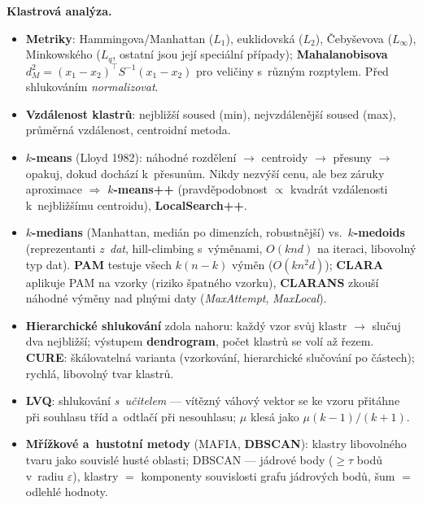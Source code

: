 \documentclass[11pt,a4paper]{article}
\theoremstyle{definition}
\begin{document}
\textbf{Klastrová analýza.}
\begin{itemize}
\item \textbf{Metriky}: Hammingova/Manhattan ($L_1$), euklidovská ($L_2$), Čebyševova
 ($L_\infty$), Minkowského ($L_q$, ostatní jsou její speciální případy);
 \textbf{Mahalanobisova} $d_M^2=(x_1-x_2)^{\!\top}S^{-1}(x_1-x_2)$ pro veličiny
 s~různým rozptylem. Před shlukováním \emph{normalizovat}.
\item \textbf{Vzdálenost klastrů}: nejbližší soused (min), nejvzdálenější soused (max),
 průměrná vzdálenost, centroidní metoda.
\item \textbf{$k$-means} (Lloyd 1982): náhodné rozdělení $\to$ centroidy $\to$ přesuny
 $\to$ opakuj, dokud dochází k~přesunům. Nikdy nezvýší cenu, ale bez záruky aproximace
 $\Rightarrow$ \textbf{$k$-means++} (pravděpodobnost $\propto$ kvadrát vzdálenosti
 k~nejbližšímu centroidu), \textbf{LocalSearch++}.
\item \textbf{$k$-medians} (Manhattan, medián po dimenzích, robustnější) vs.\
 \textbf{$k$-medoids} (reprezentanti \emph{z~dat}, hill-climbing s~výměnami,
 $O(knd)$ na iteraci, libovolný typ dat). \textbf{PAM} testuje všech $k(n-k)$ výměn
 ($O(kn^2d)$); \textbf{CLARA} aplikuje PAM na vzorky (riziko špatného vzorku),
 \textbf{CLARANS} zkouší náhodné výměny nad plnými daty (\emph{MaxAttempt},
 \emph{MaxLocal}).
\item \textbf{Hierarchické shlukování} zdola nahoru: každý vzor svůj klastr $\to$ slučuj dva
 nejbližší; výstupem \textbf{dendrogram}, počet klastrů se volí až řezem.
 \textbf{CURE}: škálovatelná varianta (vzorkování, hierarchické slučování po částech);
 rychlá, libovolný tvar klastrů.
\item \textbf{LVQ}: shlukování \emph{s~učitelem} --- vítězný váhový vektor se ke vzoru
 přitáhne při souhlasu tříd a~odtlačí při nesouhlasu; $\mu$ klesá jako $\mu(k-1)/(k+1)$.
\item \textbf{Mřížkové a~hustotní metody} (MAFIA, \textbf{DBSCAN}): klastry libovolného
 tvaru jako souvislé husté oblasti; DBSCAN --- jádrové body ($\ge\tau$ bodů v~radiu
 $\varepsilon$), klastry $=$ komponenty souvislosti grafu jádrových bodů, šum $=$
 odlehlé hodnoty.
\end{itemize}
\end{document}
